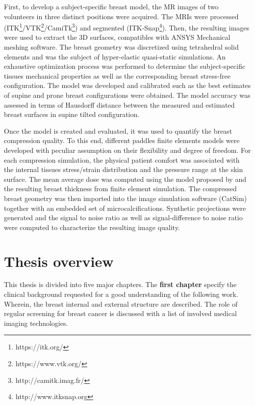 First, to develop a subject-specific breast model, the MR images of two volunteers in three distinct positions were acquired. The MRIs were processed (ITK\footnote{https://itk.org/}/VTK\footnote{https://www.vtk.org/}/CamiTk\footnote{http://camitk.imag.fr/}) and segmented (ITK-Snap\footnote{http://www.itksnap.org}). Then, the resulting images were used to extract the 3D surfaces, compatibles with ANSYS Mechanical meshing software. The breast geometry was discretized using tetrahedral solid elements and was the subject of hyper-elastic quasi-static simulations. An exhaustive optimization process was performed to determine the subject-specific tissues mechanical properties as well as the corresponding breast stress-free configuration. The model was developed and calibrated such as the best estimates of supine and prone breast configurations were obtained. The model accuracy was assessed in terms of Hausdorff distance between the measured and estimated breast surfaces in supine tilted configuration.

Once the model is created and evaluated, it was used to quantify the breast compression quality. To this end, different paddles finite elements models were developed with peculiar assumption on their flexibility and degree of freedom. For each compression simulation, the physical patient comfort was associated with the internal tissues stress/strain distribution and the pressure range at the skin surface. The mean average dose was computed using the model proposed by \cite{dance_additional_2000} and the resulting breast thickness from finite element simulation. The compressed breast geometry was then imported into the image simulation software (CatSim) together with an embedded set of microcalcifications. Synthetic projections were generated and the signal to noise ratio as well as signal-difference to noise ratio were computed to characterize the resulting image quality.   

\cleardoublepage
\chapter*{Thesis overview}\label{section:thesisoverview}

This thesis is divided into five major chapters. The \textbf{first chapter} specify the clinical background  requested for a good understanding of the following work. Wherein, the breast internal and external structure are described. The role of regular screening for breast cancer is discussed with a list of involved medical imaging technologies. 

